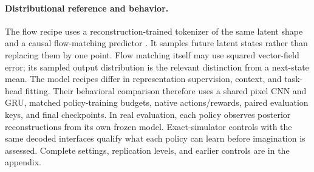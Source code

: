 \paragraph{Distributional reference and behavior.}
The flow recipe uses a reconstruction-trained tokenizer of the same latent shape and a causal
flow-matching predictor \citep{lipman2023flowmatching,hafner2025dreamer4}. It samples future latent
states rather than replacing them by one point. Flow matching itself may use squared vector-field
error; its sampled output distribution is the relevant distinction from a next-state mean.
The model recipes differ in representation supervision, context, and task-head fitting.
Their behavioral comparison therefore uses a shared pixel CNN and GRU, matched policy-training
budgets, native actions/rewards, paired evaluation keys, and final checkpoints. In real evaluation,
each policy observes posterior reconstructions from its own frozen model. Exact-simulator controls
with the same decoded interfaces qualify what each policy can learn before imagination is assessed.
Complete settings, replication levels, and earlier controls are in the appendix.
